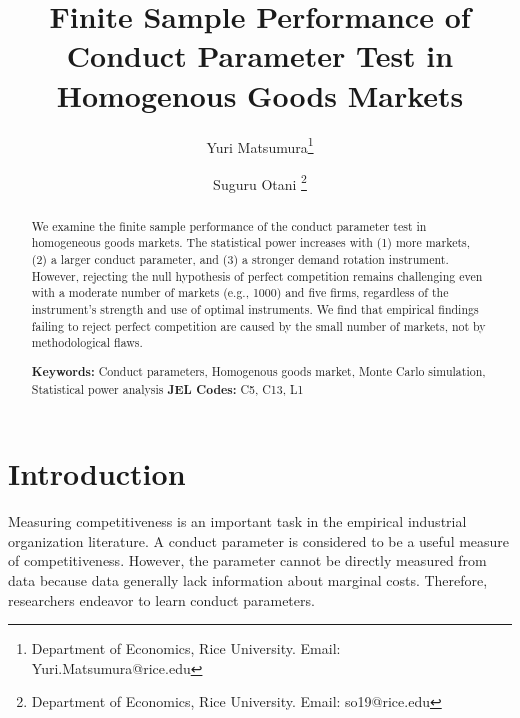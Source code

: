 \documentclass[11pt, a4paper]{article}
\title{Finite Sample Performance of Conduct Parameter Test in Homogenous Goods Markets}
\author{Yuri Matsumura\thanks{Department of Economics, Rice University. Email: Yuri.Matsumura@rice.edu} \and Suguru Otani \thanks{Department of Economics, Rice University. Email: so19@rice.edu
}}
\begin{document}
\maketitle
\begin{abstract}
    We examine the finite sample performance of the conduct parameter test in homogeneous goods markets. The statistical power increases with (1) more markets, (2) a larger conduct parameter, and (3) a stronger demand rotation instrument. However, rejecting the null hypothesis of perfect competition remains challenging even with a moderate number of markets (e.g., 1000) and five firms, regardless of the instrument's strength and use of optimal instruments. We find that empirical findings failing to reject perfect competition are caused by the small number of markets, not by methodological flaws.
\vspace{0.1in}

\noindent\textbf{Keywords:} Conduct parameters, Homogenous goods market, Monte Carlo simulation, Statistical power analysis
\vspace{0in}
\newline
\noindent\textbf{JEL Codes:} C5, C13, L1

\bigskip
\end{abstract}


\section{Introduction}
Measuring competitiveness is an important task in the empirical industrial organization literature.
A conduct parameter is considered to be a useful measure of competitiveness. 
However, the parameter cannot be directly measured from data because data generally lack information about marginal costs.
Therefore, researchers endeavor to learn conduct parameters.
\end{document}
